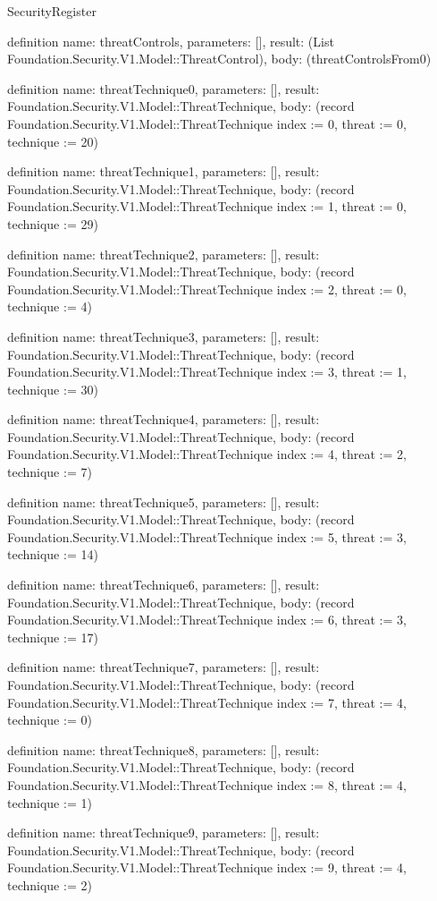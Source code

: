 \begin{lexlean}{SecurityRegister}
\begin{semanticmodule}
definition{
  name: threatControls,
  parameters: [],
  result: (List Foundation.Security.V1.Model::ThreatControl),
  body: (threatControlsFrom0)
}

definition{
  name: threatTechnique0,
  parameters: [],
  result: Foundation.Security.V1.Model::ThreatTechnique,
  body: (record Foundation.Security.V1.Model::ThreatTechnique {index := 0, threat := 0, technique := 20})
}

definition{
  name: threatTechnique1,
  parameters: [],
  result: Foundation.Security.V1.Model::ThreatTechnique,
  body: (record Foundation.Security.V1.Model::ThreatTechnique {index := 1, threat := 0, technique := 29})
}

definition{
  name: threatTechnique2,
  parameters: [],
  result: Foundation.Security.V1.Model::ThreatTechnique,
  body: (record Foundation.Security.V1.Model::ThreatTechnique {index := 2, threat := 0, technique := 4})
}

definition{
  name: threatTechnique3,
  parameters: [],
  result: Foundation.Security.V1.Model::ThreatTechnique,
  body: (record Foundation.Security.V1.Model::ThreatTechnique {index := 3, threat := 1, technique := 30})
}

definition{
  name: threatTechnique4,
  parameters: [],
  result: Foundation.Security.V1.Model::ThreatTechnique,
  body: (record Foundation.Security.V1.Model::ThreatTechnique {index := 4, threat := 2, technique := 7})
}

definition{
  name: threatTechnique5,
  parameters: [],
  result: Foundation.Security.V1.Model::ThreatTechnique,
  body: (record Foundation.Security.V1.Model::ThreatTechnique {index := 5, threat := 3, technique := 14})
}

definition{
  name: threatTechnique6,
  parameters: [],
  result: Foundation.Security.V1.Model::ThreatTechnique,
  body: (record Foundation.Security.V1.Model::ThreatTechnique {index := 6, threat := 3, technique := 17})
}

definition{
  name: threatTechnique7,
  parameters: [],
  result: Foundation.Security.V1.Model::ThreatTechnique,
  body: (record Foundation.Security.V1.Model::ThreatTechnique {index := 7, threat := 4, technique := 0})
}

definition{
  name: threatTechnique8,
  parameters: [],
  result: Foundation.Security.V1.Model::ThreatTechnique,
  body: (record Foundation.Security.V1.Model::ThreatTechnique {index := 8, threat := 4, technique := 1})
}

definition{
  name: threatTechnique9,
  parameters: [],
  result: Foundation.Security.V1.Model::ThreatTechnique,
  body: (record Foundation.Security.V1.Model::ThreatTechnique {index := 9, threat := 4, technique := 2})
}


\end{semanticmodule}
\end{lexlean}
